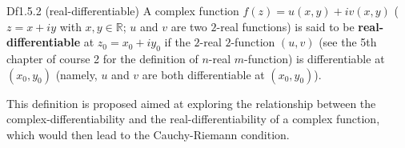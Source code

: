 \documentclass{article}
\begin{document}
\begin{Df}{Df1.5.2 (real-differentiable)}
    A complex function $f(z) = u(x, y) + iv(x, y)$ ($z = x+iy$ with $x, y\in\mathbb{R}$; $u$ and $v$ are two $2$-real functions) is said to be \textbf{real-differentiable} at $z_0 = x_0+iy_0$ if the $2$-real $2$-function $(u, v)$ (see the 5th chapter of course 2 for the definition of $n$-real $m$-function) is differentiable at $(x_0, y_0)$ (namely, $u$ and $v$ are both differentiable at $(x_0, y_0)$).
\end{Df}

\begin{Rmk}{}
    This definition is proposed aimed at exploring the relationship between the complex-differentiability and the real-differentiability of a complex function, which would then lead to the Cauchy-Riemann condition.
\end{Rmk}
\end{document}
